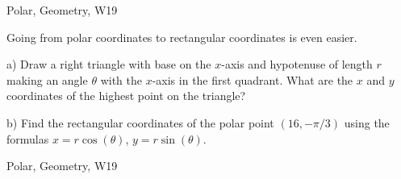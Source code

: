 \begin{tagblock}{Polar, Geometry, W19}
\begin{question}

Going from polar coordinates to rectangular coordinates is even easier. 

\bigskip

a) Draw a right triangle with base on the $x$-axis and hypotenuse of length $r$ making an angle $\theta$ with the $x$-axis in the first quadrant. What are the $x$ and $y$ coordinates of the highest point on the triangle?

\bigskip

b) Find the rectangular coordinates of the polar point $(16,-\pi/3)$ using the formulas $x=r\cos(\theta)$, $y=r\sin(\theta)$. 
	
	
\begin{tags}
	    Polar, Geometry, W19
\end{tags}
	
\begin{diary}
\end{diary}
	
\begin{solution}
	   
\end{solution}
	
\end{question}

\end{tagblock}



